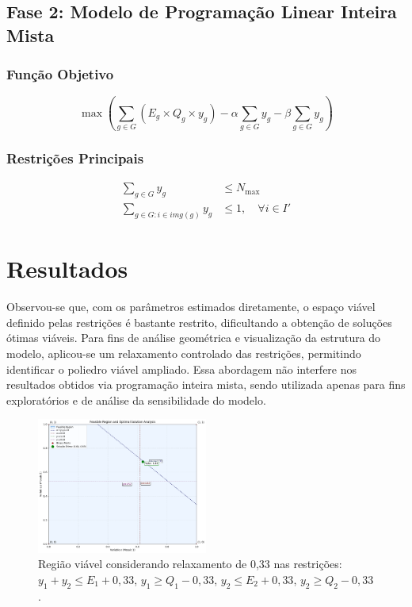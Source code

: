 \documentclass[a4paper,11pt]{article}
\begin{document}
\subsection{Fase 2: Modelo de Programação Linear Inteira Mista}
\subsubsection{Função Objetivo}
\begin{equation}
\max \left( \sum_{g \in G} (E_g \times Q_g \times y_g) - \alpha \sum_{g \in G} y_g - \beta \sum_{g \in G} y_g \right)
\end{equation}

\subsubsection{Restrições Principais}
\begin{align}
    \sum_{g \in G} y_g &\leq N_{\max} \\
    \sum_{g \in G : i \in img(g)} y_g &\leq 1, \quad \forall i \in I'
\end{align}

\section{Resultados}
Observou-se que, com os parâmetros estimados diretamente, o espaço viável definido pelas restrições é bastante restrito, dificultando a obtenção de soluções ótimas viáveis. Para fins de análise geométrica e visualização da estrutura do modelo, aplicou-se um relaxamento controlado das restrições, permitindo identificar o poliedro viável ampliado. Essa abordagem não interfere nos resultados obtidos via programação inteira mista, sendo utilizada apenas para fins exploratórios e de análise da sensibilidade do modelo.

\begin{figure}[H]
    \centering
    \includegraphics[width=0.5\textwidth]{optimization_visualization.png}
    \caption{
        Região viável considerando relaxamento de 0{,}33 nas restrições:
        $y_1 + y_2 \leq E_1 + 0{,}33$, 
        $y_1 \geq Q_1 - 0{,}33$, 
        $y_2 \leq E_2 + 0{,}33$, 
        $y_2 \geq Q_2 - 0{,}33$.
    }
    \label{fig:areas}
\end{figure}
\end{document}
